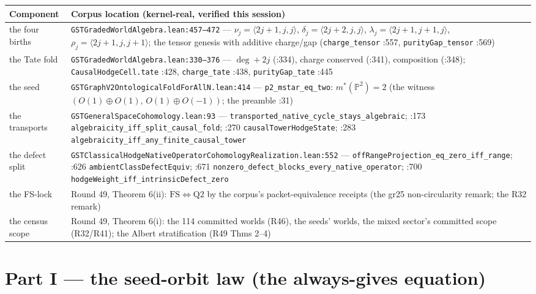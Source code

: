 \documentclass[11pt]{article}
\begin{document}
\begin{longtable}{p{5.2cm}p{9.8cm}}
\toprule
\textbf{Component} & \textbf{Corpus location (kernel-real, verified this session)} \\
\midrule
the four births & \texttt{GSTGradedWorldAlgebra.lean:457--472} --- $\nu_j=\langle 2j{+}1,j,j\rangle$, $\delta_j=\langle 2j{+}2,j,j\rangle$, $\lambda_j=\langle 2j{+}1,j{+}1,j\rangle$, $\rho_j=\langle 2j{+}1,j,j{+}1\rangle$; the tensor genesis with additive charge/gap (\texttt{charge\_tensor} :557, \texttt{purityGap\_tensor} :569) \\
the Tate fold & \texttt{GSTGradedWorldAlgebra.lean:330--376} --- $\deg{+}2j$ (:334), charge conserved (:341), composition (:348); \texttt{CausalHodgeCell.tate} :428, \texttt{charge\_tate} :438, \texttt{purityGap\_tate} :445 \\
the seed & \texttt{GSTGraphV2OntologicalFoldForAllN.lean:414} --- \texttt{p2\_mstar\_eq\_two}: $m^*(\mathbb P^2)=2$ (the witness $(O(1)\oplus O(1),\,O(1)\oplus O(-1))$; the preamble :31) \\
the transports & \texttt{GSTGeneralSpaceCohomology.lean:93} --- \texttt{transported\_native\_cycle\_stays\_algebraic}; :173 \texttt{algebraicity\_iff\_split\_causal\_fold}; :270 \texttt{causalTowerHodgeState}; :283 \texttt{algebraicity\_iff\_any\_finite\_causal\_tower} \\
the defect split & \texttt{GSTClassicalHodgeNativeOperatorCohomologyRealization.lean:552} --- \texttt{offRangeProjection\_eq\_zero\_iff\_range}; :626 \texttt{ambientClassDefectEquiv}; :671 \texttt{nonzero\_defect\_blocks\_every\_native\_operator}; :700 \texttt{hodgeWeight\_iff\_intrinsicDefect\_zero} \\
the FS-lock & Round 49, Theorem 6(ii): $\mathrm{FS}\iff\mathrm{Q2}$ by the corpus's packet-equivalence receipts (the gr25 non-circularity remark; the R32 remark) \\
the census scope & Round 49, Theorem 6(i): the 114 committed worlds (R46), the seeds' worlds, the mixed sector's committed scope (R32/R41); the Albert stratification (R49 Thms 2--4) \\
\bottomrule
\end{longtable}

\section{Part I --- the seed-orbit law (the always-gives equation)}
\end{document}
